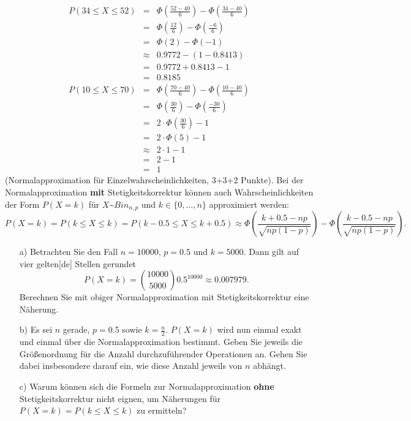 \documentclass[twoside]{article}
\begin{document}
\sss
    \begin{equation*}
        \begin{array}{rll}
            P(34 \leq X\leq 52)&=&\Phi\left(\frac{52-40}{6}\right)-\Phi\left(\frac{34-40}{6}\right)\\
            &=&\Phi\left(\frac{12}{6}\right)-\Phi\left(\frac{-6}{6}\right)\\
            &=&\Phi(2)-\Phi(-1)\\
            &\approx&0.9772-(1-0.8413)\\
            &=&0.9772+0.8413-1\\
            &=&0.8185
        \end{array}
    \end{equation*}
\sss
    \begin{equation*}
        \begin{array}{rll}
            P(10 \leq X\leq 70)&=&\Phi\left(\frac{70-40}{6}\right)-\Phi\left(\frac{10-40}{6}\right)\\
            &=&\Phi\left(\frac{30}{6}\right)-\Phi\left(\frac{-30}{6}\right)\\
            &=&2\cdot\Phi\left(\frac{30}{6}\right)-1\\
            &=&2\cdot\Phi(5)-1\\
            &\approx&2\cdot 1-1\\
            &=&2-1\\
            &=&1
        \end{array}
    \end{equation*}
(Normalapproximation für Einzelwahrscheinlichkeiten, 3+3+2 Punkte).
Bei der Normalapproximation \textbf{mit} Stetigkeitskorrektur können auch Wahrscheinlichkeiten der Form $P(X=k)$ für $X$\textasciitilde$Bin_{n,p}$ und $k \in \{0,...,n\}$ approximiert werden:
\[
	P(X=k)=P(k \leq X \leq k)=P(k-0.5\leq X \leq k+0.5) \approx \Phi\left( \frac{k+0.5-np}{\sqrt{np(1-p)}} \right)-\Phi\left( \frac{k-0.5-np}{\sqrt{
	np(1-p)}} \right).
\]
\begin{enumerate}
	\item[a)] Betrachten Sie den Fall $n=10000$, $p=0.5$ und $k=5000$.
		Dann gilt auf vier gelten[de] Stellen gerundet
		\[
			P(X=k)=\binom{10000}{5000}0.5^{10000}\approx0.007979.
		\]
		Berechnen Sie mit obiger Normalapproximation mit Stetigkeitskorrektur eine Näherung.
	\item[b)] Es sei $n$ gerade, $p=0.5$ sowie $k=\frac{n}{2}$.
		$P(X=k)$ wird nun einmal exakt und einmal über die Normalapproximation bestimmt.
		Geben Sie jeweils die Größenordnung für die Anzahl durchzuführender Operationen an.
		Gehen Sie dabei insbesondere darauf ein, wie diese Anzahl jeweils von $n$ abhängt.
	\item[c)] Warum können sich die Formeln zur Normalapproximation \textbf{ohne} Stetigkeitskorrektur nicht eignen, um Näherungen für $P(X=k)=P(k \leq X \leq k)$ zu ermitteln?
\end{enumerate}
\end{document}
